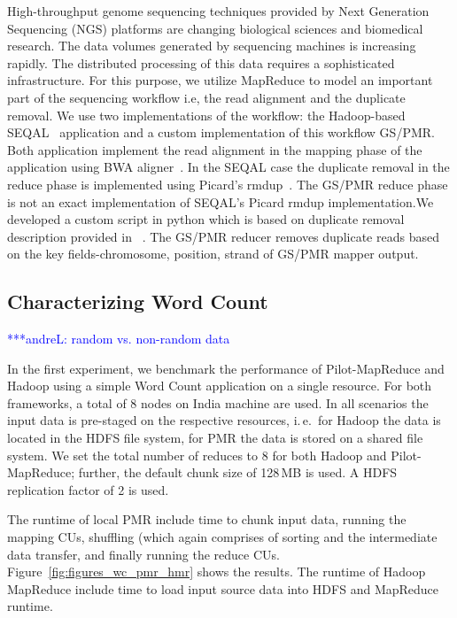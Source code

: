 \documentclass{acm_proc_article-sp}
\newcommand{\alnote}[1]{ {\textcolor{blue} { ***andreL: #1 }}}
\newcommand{\alnote}[1]{}
\newcommand{\pilotmapreduce}{Pilot-MapReduce\xspace}
\begin{document}
High-throughput genome sequencing techniques provided by Next Generation
Sequencing (NGS) platforms are changing biological sciences and biomedical
research. The data volumes generated by sequencing machines is increasing
rapidly. The distributed processing of this data requires a sophisticated
infrastructure. For this purpose, we utilize MapReduce to model an important
part of the sequencing workflow i.e, the read alignment and the duplicate
removal. We use two implementations of the workflow: the Hadoop-based 
SEQAL~\cite{seal-2011} application and a custom implementation of this workflow 
GS/PMR. Both application implement the read alignment in the mapping phase of 
the application using BWA aligner~\cite{Li:2010:FAL:1741823.1741825}. In the 
SEQAL case the duplicate removal in the reduce phase is implemented using  
Picard's rmdup~\cite{picard}. The GS/PMR reduce phase is not an exact implementation of
SEQAL's Picard rmdup implementation.We developed a custom script in python
which is based on duplicate removal description provided in ~\cite{seal-2011}. 
The GS/PMR reducer removes duplicate reads based on the key fields-chromosome,
position, strand of GS/PMR mapper output.


\subsection{Characterizing Word Count}
\alnote{random vs. non-random data}

In the first experiment, we benchmark the performance of \pilotmapreduce and
Hadoop using a simple Word Count application on a single resource. For both
frameworks, a total of 8 nodes on India machine are used. In all scenarios the
input data is pre-staged on the respective resources, i.\,e.\ for Hadoop the
data is located in the HDFS file system, for PMR the data is stored on a shared
file system. We set the total number of reduces to 8 for both Hadoop and
\pilotmapreduce; further, the default chunk size of 128\,MB is used. A HDFS
replication factor of 2 is used.

The runtime of local PMR include time to chunk input data, running the mapping
CUs, shuffling (which again comprises of sorting and the intermediate data
transfer, and finally running the reduce CUs.
Figure~\ref{fig:figures_wc_pmr_hmr} shows the results. The runtime
of Hadoop MapReduce include time to load input source data into HDFS and
MapReduce runtime.
\end{document}
